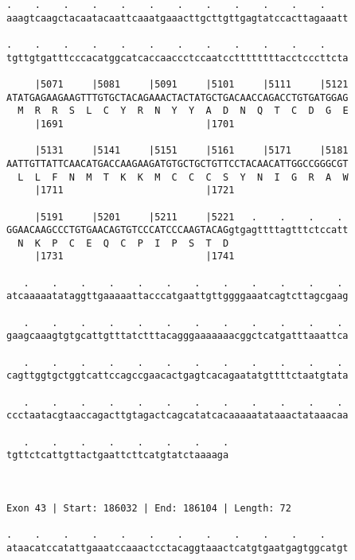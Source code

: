 \documentclass{article}
\begin{document}
\begin{Verbatim}
.    .    .    .    .    .    .    .    .    .    .    .    
aaagtcaagctacaatacaattcaaatgaaacttgcttgttgagtatccacttagaaatt
                                                            
.    .    .    .    .    .    .    .    .    .    .    .    
tgttgtgatttcccacatggcatcaccaaccctccaatccttttttttacctcccttcta
                                                            
     |5071     |5081     |5091     |5101     |5111     |5121
ATATGAGAAGAAGTTTGTGCTACAGAAACTACTATGCTGACAACCAGACCTGTGATGGAG
  M  R  R  S  L  C  Y  R  N  Y  Y  A  D  N  Q  T  C  D  G  E
     |1691                         |1701                    
  
     |5131     |5141     |5151     |5161     |5171     |5181
AATTGTTATTCAACATGACCAAGAAGATGTGCTGCTGTTCCTACAACATTGGCCGGGCGT
  L  L  F  N  M  T  K  K  M  C  C  C  S  Y  N  I  G  R  A  W
     |1711                         |1721                    
  
     |5191     |5201     |5211     |5221   .    .    .    . 
GGAACAAGCCCTGTGAACAGTGTCCCATCCCAAGTACAGgtgagttttagtttctccatt
  N  K  P  C  E  Q  C  P  I  P  S  T  D                     
     |1731                         |1741                    
  
   .    .    .    .    .    .    .    .    .    .    .    . 
atcaaaaatataggttgaaaaattacccatgaattgttggggaaatcagtcttagcgaag
                                                            
   .    .    .    .    .    .    .    .    .    .    .    . 
gaagcaaagtgtgcattgtttatctttacagggaaaaaaacggctcatgatttaaattca
                                                            
   .    .    .    .    .    .    .    .    .    .    .    . 
cagttggtgctggtcattccagccgaacactgagtcacagaatatgttttctaatgtata
                                                            
   .    .    .    .    .    .    .    .    .    .    .    . 
ccctaatacgtaaccagacttgtagactcagcatatcacaaaaatataaactataaacaa
                                                            
   .    .    .    .    .    .    .    .
tgttctcattgttactgaattcttcatgtatctaaaaga
                                       
                                       
 
Exon 43 | Start: 186032 | End: 186104 | Length: 72
 
.    .    .    .    .    .    .    .    .    .    .    .    
ataacatccatattgaaatccaaactcctacaggtaaactcatgtgaatgagtggcatgt
                                                            

\end{Verbatim}
\end{document}
